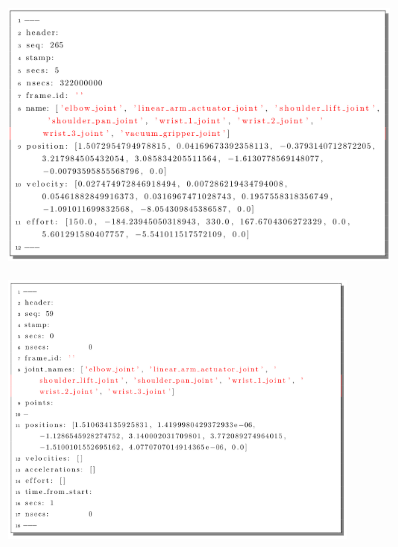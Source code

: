 \documentclass[notes,slidesec,a4]{seminar}
\begin{document}
\begin{hslide}
	\begin{center}
		\begin{figure}
			\includegraphics[width=0.9\textwidth]{mensajestate.png}
		\end{figure}
	\end{center}
\end{hslide}

\begin{hslide}
	\begin{center}
		\begin{figure}
			\includegraphics[width=0.8\textwidth]{mensajecommand.png}
		\end{figure}
	\end{center}
\end{hslide}
\end{document}
